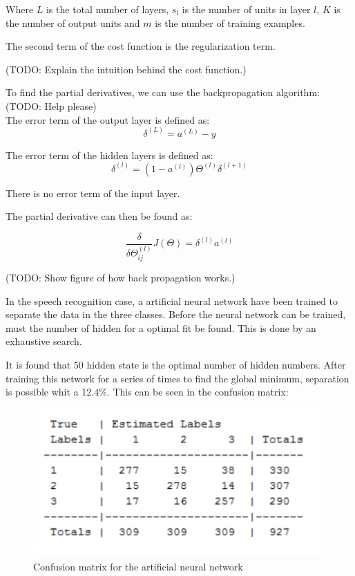 Where $L$ is the total number of layers, $s_l$ is the number of units in layer $l$, $K$ is the number of output units and $m$ is the number of training examples.

The second term of the cost function is the regularization term.

(TODO: Explain the intuition behind the cost function.)

To find the partial derivatives, we can use the backpropagation algorithm: (TODO: Help please)\\

The error term of the output layer is defined as:
\begin{equation}
\delta^{(L)} = a^{(L)}-y
\end{equation}

The error term of the hidden layers is defined as:
\begin{equation}
\delta^{(l)} = (1-a^{(l)})\Theta^{(l)}\delta^{(l+1)}
\end{equation}

There is no error term of the input layer. 

The partial derivative can then be found as:

\begin{equation}
\frac{\delta}{\delta\Theta^{(l)}_{ij}}J(\Theta) = 
\delta^{(l)}a^{(l)}
\end{equation}

(TODO: Show figure of how back propagation works.)

In the speech recognition case, a artificial neural network have been trained to separate the data in the three classes. Before the neural network can be trained, must the number of hidden for a optimal fit be found. This is done by an exhaustive search. 


It is found that 50 hidden state is the optimal number of hidden numbers. After training this network for a series of times to find the global minimum, separation is possible whit a 12.4\%. This can be seen in the confusion matrix: 

\begin{figure}[H]
\centering
\includegraphics[scale=0.8]{billeder/conmatnn}
\caption{Confusion matrix for the artificial neural network }
\label{fig:conmatnn}
\end{figure}
